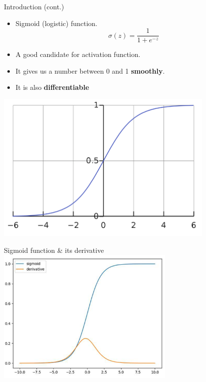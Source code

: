 \documentclass[serif, aspectratio=169]{beamer}
\begin{document}
    \begin{frame}{Introduction (cont.)}
        \begin{minipage}{0.55\textwidth}
            \begin{itemize}
                \item Sigmoid (logistic) function.
                \[
                    \sigma (z) = \frac{1}{1 + e^{-z}}
                \]
                \item A good candidate for activation function.

                \item It gives us a number between 0 and 1 \textbf{smoothly}.
                \item It is also \textbf{differentiable}

            \end{itemize}
        \end{minipage}%
        \begin{minipage}{0.4\textwidth}
            \centering
            \includegraphics[width=0.8\textwidth]{pic/sigmoid.png}
        \end{minipage}
    \end{frame}
    \begin{frame}{Sigmoid function \& its derivative}
        \centering
        \includegraphics[width=0.65\textwidth]{pic/sigmoidDer.png}
    \end{frame}
\end{document}
